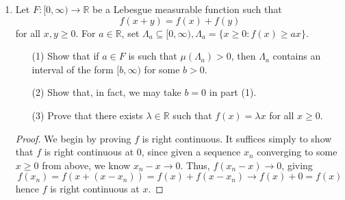 \documentclass[10pt]{article}
\newcommand{\R}{\mathbb{R}}
\renewcommand{\bar}{\overline}
\begin{document}
\begin{enumerate}
\begin{proof}
We will show that $B = \{(x,\infty] : x \in \R\}$ generates the Borel algebra on $\bar{\R}$.  Let $a < b$.  Then $(a,b] = (a,\infty] \cap (b,\infty]^c$.  Also, $\{+ \infty\} = \bigcap_1^\infty (n, \infty]$ and $\{-\infty\} = \left( \bigcup_1^\infty (-n, \infty] \right)^c$.  Obviously, $\{-\infty, +\infty\} = \{-\infty\} \cup \{+\infty\}$ and $\emptyset = \{-\infty\} \cap \{+\infty\}$.  Also, given $a<b$ we have $(a,b) = \bigcap_1^\infty (a,b+\frac{1}{n}]$, so $B$ generates every open interval, hence it generates every open set of $\R$, along with $\emptyset, \{+\infty\}, \{- \infty\},$ and $\{-\infty, + \infty\}$.  Thus the topology on $\bar{\R}$ is contained in the $\sigma$-algebra generated by $B$, and hence so is the Borel algebra on $\bar{\R}$.  Also, every set in $B$ is open in $\bar{\R}$, and hence $B$ is contained in the Borel algebra on $\bar{\R}$.  So $B$ generates the Borel algebra on $\bar{\R}$.

Finally, let $x \in \R$.  Taking an increasing sequence $r_n \rightarrow x$ of rationals, we have
$$
f^{-1}((x,\infty]) = f^{-1} \left( \bigcap_1^\infty (r_n, \infty ] \right) = \bigcap_1^\infty f^{-1}((r_n, \infty ])
$$
is a countable intersection of measurable sets, hence measurable.  By Proposition 2.1, $f$ is measurable because $f^{-1}(E)$ is measurable for each $E \in B$, and $B$ generates the Borel algebra on $\bar{\R}$.
\end{proof}

\item Let $F: [0, \infty) \rightarrow \R$ be a Lebesgue measurable function such that
$$
f(x+y) = f(x) + f(y)
$$
for all $x,y \geq 0$.  For $a \in \R$, set $\Lambda_a \subseteq [0,\infty), \Lambda_a = \{x \geq 0 : f(x) \geq ax \}$.
\begin{enumerate}
\item[(1)] Show that if $a \in F$ is such that $\mu(\Lambda_a) > 0$, then $\Lambda_a$ contains an interval of the form $[b, \infty)$ for some $b > 0$.
\item[(2)] Show that, in fact, we may take $b = 0$ in part (1).
\item[(3)] Prove that there exists $\lambda \in \R$ such that $f(x) = \lambda x$ for all $x \geq 0$.
\end{enumerate}

\begin{proof}
We begin by proving $f$ is right continuous.  It suffices simply to show that $f$ is right continuous at $0$, since given a sequence $x_n$ converging to some $x \geq 0$ from above, we know $x_n - x \rightarrow 0$.  Thus, $f(x_n - x) \rightarrow 0$, giving
$$
f(x_n) = f(x + (x-x_n)) = f(x) + f(x - x_n) \rightarrow f(x) + 0 = f(x)
$$
hence $f$ is right continuous at $x$.


\end{proof}
\end{enumerate}
\end{document}
